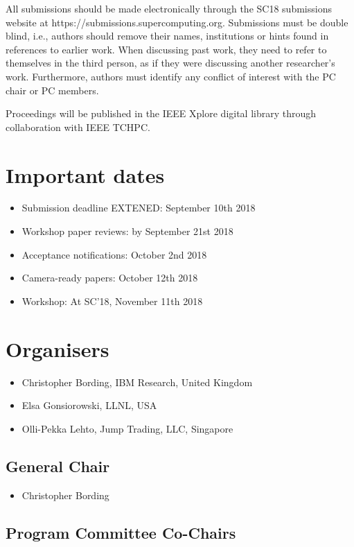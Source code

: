 \documentclass[11pt,a4paper]{article}
\begin{document}
All submissions should be made electronically through the SC18 submissions 
website at https://submissions.supercomputing.org.  Submissions must be 
double blind, i.e., authors should remove their names, institutions or hints 
found in references to earlier work. When discussing past work, they need to refer to
themselves in the third person, as if they were discussing another
researcher's work. Furthermore, authors must identify any conflict of
interest with the PC chair or PC members.

Proceedings will be published in the IEEE Xplore digital
library through collaboration with IEEE TCHPC.

\section{Important dates}
\begin{itemize}
\item Submission deadline EXTENED: September 10th 2018
\item Workshop paper reviews: by September 21st 2018
\item Acceptance notifications: October 2nd 2018
\item Camera-ready papers: October 12th 2018
\item Workshop: At SC'18, November 11th 2018
\end{itemize}

\section{Organisers}

\begin{itemize}
\item Christopher Bording, IBM Research, United Kingdom 
\item Elsa Gonsiorowski, LLNL, USA
\item Olli-Pekka Lehto, Jump Trading, LLC, Singapore
\end{itemize}

\subsection{General Chair}
\begin{itemize}
\item Christopher Bording
\end{itemize}
\subsection{Program Committee Co-Chairs}
\end{document}
